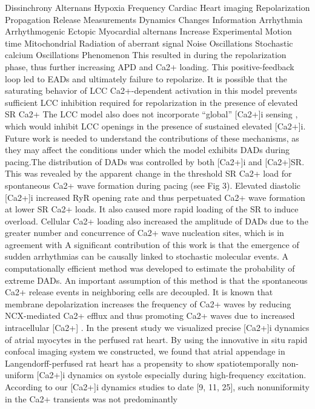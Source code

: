 \documentclass[a4paper,12pt]{article}
\begin{document}
Dissinchrony
Alternans
Hypoxia
Frequency
Cardiac
Heart imaging
Repolarization
Propagation
Release
Measurements
Dynamics
Changes
Information
Arrhythmia
Arrhythmogenic
Ectopic
Myocardial alternans
Increase
Experimental
Motion time
Mitochondrial
Radiation of aberrant signal
Noise
Oscillations
Stochastic calcium Oscillations
Phenomenon
This resulted in
 during the repolarization phase,
thus further increasing APD and Ca2+ loading. This positive-feedback loop led to EADs and
ultimately failure to repolarize. It is possible that the saturating behavior of LCC Ca2+-dependent activation in this model prevents sufficient LCC inhibition required for repolarization in
the presence of elevated SR Ca2+
The LCC model also does not incorporate “global” [Ca2+]i
sensing , which would inhibit LCC openings in the presence of sustained elevated [Ca2+]i.
Future work is needed to understand the contributions of these mechanisms, as they may
affect the conditions under which the model exhibits DADs during pacing.The distribution of DADs was controlled by both [Ca2+]i and [Ca2+]SR. This was revealed
by the apparent change in the threshold SR Ca2+ load for spontaneous Ca2+ wave formation
during pacing (see Fig 3). Elevated diastolic [Ca2+]i increased RyR opening rate and thus perpetuated Ca2+ wave formation at lower SR Ca2+ loads. It also caused more rapid loading of the
SR to induce overload. Cellular Ca2+ loading also increased the amplitude of DADs due to the
greater number and concurrence of Ca2+ wave nucleation sites, which is in agreement with
A significant contribution of this work is that the emergence of sudden arrhythmias can be
causally linked to stochastic molecular events. A computationally efficient method was developed to estimate the probability of extreme DADs. An important assumption of this method is
that the spontaneous Ca2+ release events in neighboring cells are decoupled. It is known that
membrane depolarization increases the frequency of Ca2+ waves by reducing NCX-mediated
Ca2+ efflux and thus promoting Ca2+ waves due to increased intracellular [Ca2+] \cite{walker2017estimating}.
In the present study we visualized precise [Ca2+]i dynamics of atrial myocytes in the perfused rat heart.
By
using the innovative in situ rapid confocal imaging system
we constructed, we found that atrial appendage in
Langendorff-perfused rat heart has a propensity to show
spatiotemporally non-uniform [Ca2+]i dynamics on systole
especially during high-frequency excitation. According to
our [Ca2+]i dynamics studies to date [9, 11, 25], such nonuniformity
in the Ca2+ transients was not predominantly
\end{document}
